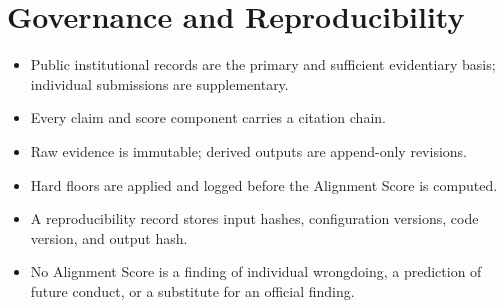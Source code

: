 \section{Governance and Reproducibility}

\begin{itemize}
  \item Public institutional records are the primary and sufficient
        evidentiary basis; individual submissions are supplementary.
  \item Every claim and score component carries a citation chain.
  \item Raw evidence is immutable; derived outputs are append-only revisions.
  \item Hard floors are applied and logged before the Alignment Score is
        computed.
  \item A reproducibility record stores input hashes, configuration versions,
        code version, and output hash.
  \item No Alignment Score is a finding of individual wrongdoing, a prediction
        of future conduct, or a substitute for an official finding.
\end{itemize}
